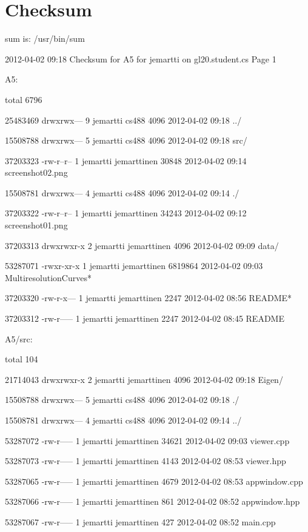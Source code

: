 \documentclass[11pt]{article}
\begin{document}
\section{Checksum}
\label{sec:checksum}
\begin{flushleft}
{ \scriptsize
sum is: /usr/bin/sum

2012-04-02 09:18 Checksum for A5 for jemartti on gl20.student.cs  Page 1

A5:

total 6796

25483469 drwxrwx--- 9 jemartti cs488          4096 2012-04-02 09:18 ../

15508788 drwxrwx--- 5 jemartti cs488          4096 2012-04-02 09:18 src/

37203323 -rw-r--r-- 1 jemartti jemarttinen   30848 2012-04-02 09:14 screenshot02.png

15508781 drwxrwx--- 4 jemartti cs488          4096 2012-04-02 09:14 ./

37203322 -rw-r--r-- 1 jemartti jemarttinen   34243 2012-04-02 09:12 screenshot01.png

37203313 drwxrwxr-x 2 jemartti jemarttinen    4096 2012-04-02 09:09 data/

53287071 -rwxr-xr-x 1 jemartti jemarttinen 6819864 2012-04-02 09:03 MultiresolutionCurves*

37203320 -rw-r-x--- 1 jemartti jemarttinen    2247 2012-04-02 08:56 README*

37203312 -rw-r----- 1 jemartti jemarttinen    2247 2012-04-02 08:45 README~

A5/src:

total 104

21714043 drwxrwxr-x 2 jemartti jemarttinen  4096 2012-04-02 09:18 Eigen/

15508788 drwxrwx--- 5 jemartti cs488        4096 2012-04-02 09:18 ./

15508781 drwxrwx--- 4 jemartti cs488        4096 2012-04-02 09:14 ../

53287072 -rw-r----- 1 jemartti jemarttinen 34621 2012-04-02 09:03 viewer.cpp

53287073 -rw-r----- 1 jemartti jemarttinen  4143 2012-04-02 08:53 viewer.hpp

53287065 -rw-r----- 1 jemartti jemarttinen  4679 2012-04-02 08:53 appwindow.cpp

53287066 -rw-r----- 1 jemartti jemarttinen   861 2012-04-02 08:52 appwindow.hpp

53287067 -rw-r----- 1 jemartti jemarttinen   427 2012-04-02 08:52 main.cpp

}
\end{flushleft}
\end{document}
